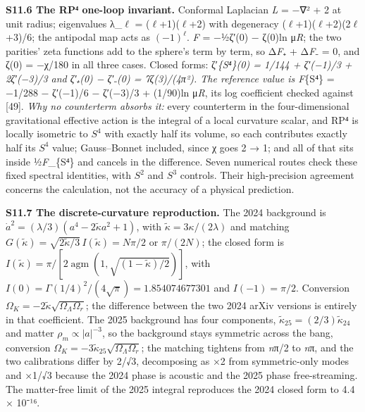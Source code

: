 \documentclass[
]{article}
\begin{document}
\textbf{S11.6 The RP⁴ one-loop invariant.} Conformal Laplacian \emph{L}
= −∇² + 2 at unit radius; eigenvalues λ\_\(\ell\) =
(\(\ell\)+1)(\(\ell\)+2) with degeneracy
(\(\ell\)+1)(\(\ell\)+2)(2\(\ell\)+3)/6; the antipodal map acts as
\((-1)^\ell\). \emph{F} = −½ζ′(0) − ζ(0)ln μ\emph{R}; the two parities'
zeta functions add to the sphere's term by term, so Δ\emph{F}₊ +
Δ\emph{F}₋ = 0, and ζ(0) = −χ/180 in all three cases. Closed forms:
ζ′\emph{\{S⁴\}(0) = 1/144 + ζ′(−1)/3 + 2ζ′(−3)/3 and ζ′₊(0) − ζ′₋(0) =
7ζ(3)/(4π²). The reference value is \emph{F}}\{S⁴\} = −1/288 − ζ′(−1)/6
− ζ′(−3)/3 + (1/90)ln μ\emph{R}, its log coefficient checked against
{[}49{]}. \emph{Why no counterterm absorbs it:} every counterterm in the
four-dimensional gravitational effective action is the integral of a
local curvature scalar, and RP⁴ is locally isometric to \(S^4\) with
exactly half its volume, so each contributes exactly half its \(S^4\)
value; Gauss--Bonnet included, since χ goes 2 → 1; and all of that sits
inside ½\emph{F}\_\{S⁴\} and cancels in the difference. Seven numerical
routes check these fixed spectral identities, with \(S^2\) and \(S^3\)
controls. Their high-precision agreement concerns the calculation, not
the accuracy of a physical prediction.

\textbf{S11.7 The discrete-curvature reproduction.} The 2024 background
is \(\dot a^2=(\lambda/3)(a^4-2\widetilde\kappa a^2+1)\), with
\(\widetilde\kappa=3\kappa/(2\lambda)\) and matching
\(G(\widetilde\kappa)=\sqrt{2\widetilde\kappa/3}\,I(\widetilde\kappa)=N\pi/2\)
or \(\pi/(2N)\); the closed form is
\(I(\widetilde\kappa)=\pi/[2\operatorname{agm}(1,\sqrt{(1-\widetilde\kappa)/2})]\),
with \(I(0)=\Gamma(1/4)^2/(4\sqrt\pi)=1.854074677301\) and
\(I(-1)=\pi/2\). Conversion
\(\Omega_K=-2\widetilde\kappa\sqrt{\Omega_\Lambda\Omega_r}\); the
difference between the two 2024 arXiv versions is entirely in that
coefficient. The 2025 background has four components,
\(\widetilde\kappa_{25}=(2/3)\widetilde\kappa_{24}\) and matter
\(\rho_m\propto |a|^{-3}\), so the background stays symmetric across the
bang, conversion
\(\Omega_K=-3\widetilde\kappa_{25}\sqrt{\Omega_\Lambda\Omega_r}\); the
matching tightens from \emph{n}π/2 to \emph{n}π, and the two
calibrations differ by 2/√3, decomposing as ×2 from symmetric-only modes
and ×1/√3 because the 2024 phase is acoustic and the 2025 phase
free-streaming. The matter-free limit of the 2025 integral reproduces
the 2024 closed form to 4.4 × 10⁻¹⁶.
\end{document}
